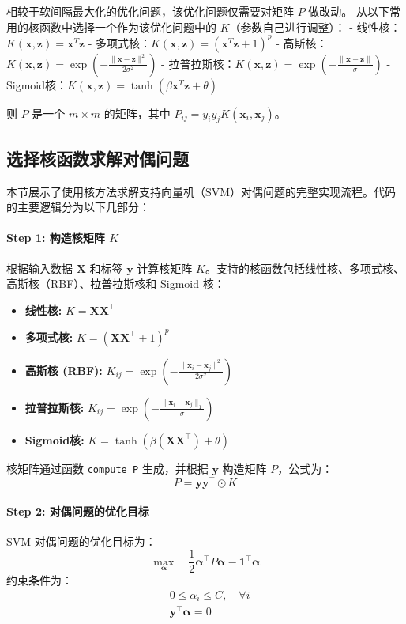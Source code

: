 \documentclass[12pt,a4paper,oneside]{article}
\begin{document}
相较于软间隔最大化的优化问题，该优化问题仅需要对矩阵 $P$ 做改动。  
从以下常用的核函数中选择一个作为该优化问题中的 $K$（参数自己进行调整）：
- 线性核：$K(\bm{x}, \bm{z}) = \bm{x}^T\bm{z}$
- 多项式核：$K(\bm{x}, \bm{z}) = (\bm{x}^T\bm{z} + 1)^p$
- 高斯核：$K(\bm{x}, \bm{z}) = \exp\left(-\frac{\|\bm{x} - \bm{z}\|^2}{2\sigma^2}\right)$
- 拉普拉斯核：$K(\bm{x}, \bm{z}) = \exp\left(-\frac{\|\bm{x} - \bm{z}\|}{\sigma}\right)$
- Sigmoid核：$K(\bm{x}, \bm{z}) = \tanh(\beta \bm{x}^T\bm{z} + \theta)$

则 $P$ 是一个 $m \times m$ 的矩阵，其中 $P_{ij} = y_i y_j K(\bm{x}_i, \bm{x}_j)$。
\subsection{选择核函数求解对偶问题}

本节展示了使用核方法求解支持向量机（SVM）对偶问题的完整实现流程。代码的主要逻辑分为以下几部分：

\paragraph{Step 1: 构造核矩阵 $K$}
根据输入数据 $\mathbf{X}$ 和标签 $\mathbf{y}$ 计算核矩阵 $K$。支持的核函数包括线性核、多项式核、高斯核（RBF）、拉普拉斯核和 Sigmoid 核：
\begin{itemize}
    \item \textbf{线性核:} $K = \mathbf{X} \mathbf{X}^\top$
    \item \textbf{多项式核:} $K = (\mathbf{X} \mathbf{X}^\top + 1)^p$
    \item \textbf{高斯核 (RBF):} $K_{ij} = \exp\left(-\frac{\|\mathbf{x}_i - \mathbf{x}_j\|^2}{2\sigma^2}\right)$
    \item \textbf{拉普拉斯核:} $K_{ij} = \exp\left(-\frac{\|\mathbf{x}_i - \mathbf{x}_j\|_1}{\sigma}\right)$
    \item \textbf{Sigmoid核:} $K = \tanh(\beta (\mathbf{X} \mathbf{X}^\top) + \theta)$
\end{itemize}
核矩阵通过函数 \texttt{compute\_P} 生成，并根据 $\mathbf{y}$ 构造矩阵 $P$，公式为：
\[
P = \mathbf{y} \mathbf{y}^\top \odot K
\]

\paragraph{Step 2: 对偶问题的优化目标}
SVM 对偶问题的优化目标为：
\[
\max_{\boldsymbol{\alpha}} \quad \frac{1}{2} \boldsymbol{\alpha}^\top P \boldsymbol{\alpha} - \mathbf{1}^\top \boldsymbol{\alpha}
\]
约束条件为：
\[
\begin{aligned}
    &0 \leq \alpha_i \leq C, \quad \forall i \\
    &\mathbf{y}^\top \boldsymbol{\alpha} = 0
\end{aligned}
\]
\end{document}
